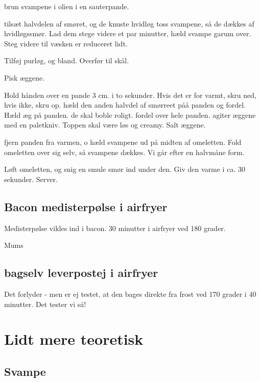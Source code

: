 \documentclass[
]{book}
\begin{document}
brun svampene i olien i en sauterpande.

tilsæt halvdelen af smøret, og de knuste hvidløg
toss svampene, så de dækkes af hvidløgssmør.
Lad dem stege videre et par minutter, hæld svampe garum over. Steg videre til væsken er reduceret lidt.

Tilføj purløg, og bland. Overfør til skål.

Pisk æggene.

Hold hånden over en pande 3 cm. i to sekunder. Hvis det er for varmt, skru ned, hvis ikke, skru op.
hæld den anden halvdel af smørreet påå panden og fordel.
Hæld æg på panden. de skal boble roligt. fordel over hele panden. agiter æggene med en paletkniv.
Toppen skal være løs og creamy. Salt æggene.

fjern panden fra varmen, o hæld svampene ud på midten af omeletten.
Fold omeletten over sig selv, så svampene dækkes. Vi går efter en halvmåne form.

Løft omeletten, og snig en smule smør ind under den. Giv den varme i ca. 30 sekunder. Server.

\hypertarget{bacon-medisterpuxf8lse-i-airfryer}{%
\section{Bacon medisterpølse i airfryer}\label{bacon-medisterpuxf8lse-i-airfryer}}

Medisterpølse vikles ind i bacon.
30 minutter i airfryer ved 180 grader.

Mums

\hypertarget{bagselv-leverpostej-i-airfryer}{%
\section{bagselv leverpostej i airfryer}\label{bagselv-leverpostej-i-airfryer}}

Det forlyder - men er ej testet, at den bages direkte fra
frost ved 170 grader i 40 minutter.
Det tester vi så!

\hypertarget{lidt-mere-teoretisk}{%
\chapter{Lidt mere teoretisk}\label{lidt-mere-teoretisk}}

\hypertarget{svampe}{%
\section{Svampe}\label{svampe}}
\end{document}
